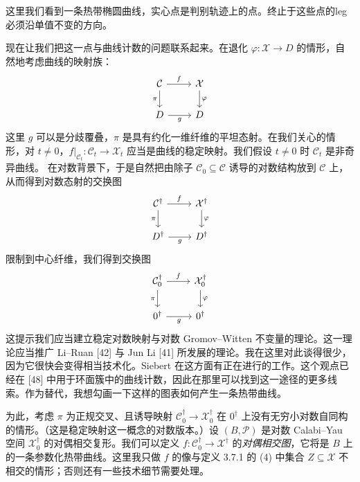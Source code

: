 这里我们看到一条热带椭圆曲线，实心点是判别轨迹上的点。终止于这些点的leg必须沿单值不变的方向。

现在让我们把这一点与曲线计数的问题联系起来。在退化 $\varphi:\mathcal X\to D$ 的情形，自然地考虑曲线的映射族：
\[
\begin{tikzcd}
\mathcal C \arrow[r, "f"] \arrow[d, "\pi"'] & \mathcal X \arrow[d, "\varphi"]\\
D \arrow[r, "g"'] & D
\end{tikzcd}
\]
这里 $g$ 可以是分歧覆叠，$\pi$ 是具有约化一维纤维的平坦态射。在我们关心的情形，对 $t\ne0$，$f|_{\mathcal C_t}:\mathcal C_t\to\mathcal X_t$ 应当是曲线的稳定映射。我们假设 $t\ne0$ 时 $\mathcal C_t$ 是非奇异曲线。
在对数背景下，于是自然把由除子 $\mathcal C_0\subseteq\mathcal C$ 诱导的对数结构放到 $\mathcal C$ 上，从而得到对数态射的交换图
\[
\begin{tikzcd}
\mathcal C^\dagger \arrow[r, "f"] \arrow[d, "\pi"'] & \mathcal X^\dagger \arrow[d, "\varphi"]\\
D^\dagger \arrow[r, "g"'] & D^\dagger
\end{tikzcd}
\]
限制到中心纤维，我们得到交换图
\[
\begin{tikzcd}
\mathcal C_0^\dagger \arrow[r, "f"] \arrow[d, "\pi"'] & \mathcal X_0^\dagger \arrow[d, "\varphi"]\\
0^\dagger \arrow[r, "g"'] & 0^\dagger
\end{tikzcd}
\]
这提示我们应当建立稳定对数映射与对数 Gromov--Witten 不变量的理论。这一理论应当推广 Li--Ruan [42] 与 Jun Li [41] 所发展的理论。我在这里对此谈得很少，因为它很快会变得相当技术化。Siebert 在这方面有正在进行的工作。这个观点已经在 [48] 中用于环面簇中的曲线计数，因此在那里可以找到这一途径的更多线索。作为替代，我想勾画一下这样的图表如何产生一条热带曲线。

为此，考虑 $\pi$ 为正规交叉、且诱导映射 $\mathcal C_0^\dagger\to\mathcal X_0^\dagger$ 在 $0^\dagger$ 上没有无穷小对数自同构的情形。（这是稳定映射这一概念的对数版本。）设 $(B,\mathcal P)$ 是对数 Calabi--Yau 空间 $\mathcal X_0^\dagger$ 的对偶相交复形。我们可以定义 $f:\mathcal C_0^\dagger\to\mathcal X^\dagger$ 的\emph{对偶相交图}，它将是 $B$ 上的一条参数化热带曲线。这里我只做 $f$ 的像与定义 3.7.1 的 (4) 中集合 $Z\subseteq\mathcal X$ 不相交的情形；否则还有一些技术细节需要处理。


